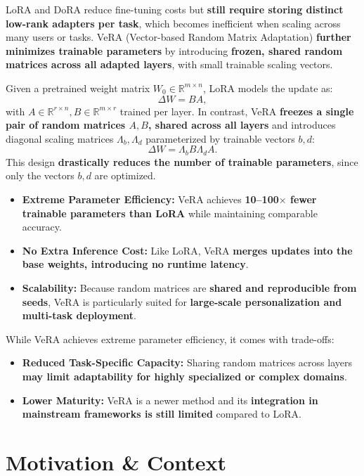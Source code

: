 \documentclass[11pt,a4paper]{article}
\begin{document}
LoRA and DoRA reduce fine-tuning costs but \textbf{still require storing distinct low-rank adapters per task}, which becomes inefficient when scaling across many users or tasks. 
VeRA \cite{kopiczko2024vera} (Vector-based Random Matrix Adaptation) \textbf{further minimizes trainable parameters} by introducing \textbf{frozen, shared random matrices across all adapted layers}, with small trainable scaling vectors.

Given a pretrained weight matrix $W_0 \in \mathbb{R}^{m \times n}$, LoRA models the update as:
\[
\Delta W = BA,
\]
with $A \in \mathbb{R}^{r \times n}, B \in \mathbb{R}^{m \times r}$ trained per layer.  
In contrast, VeRA \textbf{freezes a single pair of random matrices $A, B$, shared across all layers} and introduces diagonal scaling matrices $\Lambda_b, \Lambda_d$ parameterized by trainable vectors $b, d$:
\[
\Delta W = \Lambda_b B \Lambda_d A.
\]
This design \textbf{drastically reduces the number of trainable parameters}, since only the vectors $b, d$ are optimized.

\begin{itemize}[leftmargin=1.5em]
    \item \textbf{Extreme Parameter Efficiency:} VeRA achieves \textbf{10--100$\times$ fewer trainable parameters than LoRA} while maintaining comparable accuracy.
    \item \textbf{No Extra Inference Cost:} Like LoRA, VeRA \textbf{merges updates into the base weights, introducing no runtime latency}.
    \item \textbf{Scalability:} Because random matrices are \textbf{shared and reproducible from seeds}, VeRA is particularly suited for \textbf{large-scale personalization and multi-task deployment}.
\end{itemize}

While VeRA achieves extreme parameter efficiency, it comes with trade-offs:
\begin{itemize}[leftmargin=1.5em]
    \item \textbf{Reduced Task-Specific Capacity:} Sharing random matrices across layers \textbf{may limit adaptability for highly specialized or complex domains}.
    \item \textbf{Lower Maturity:} VeRA is a newer method and its \textbf{integration in mainstream frameworks is still limited} compared to LoRA.
\end{itemize}

\section{Motivation \& Context}
\end{document}
